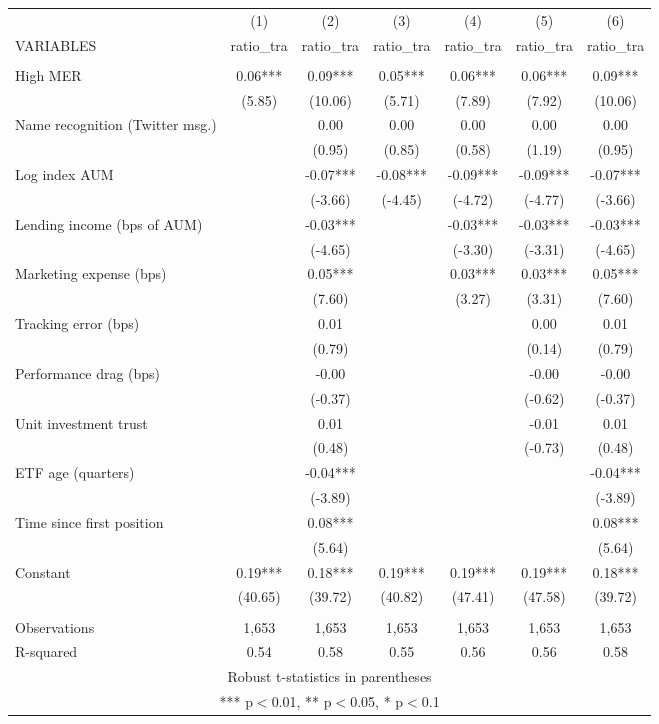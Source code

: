 \documentclass[]{article}
\begin{document}
\begin{tabular}{lcccccc} \hline
 & (1) & (2) & (3) & (4) & (5) & (6) \\
VARIABLES & ratio\_tra & ratio\_tra & ratio\_tra & ratio\_tra & ratio\_tra & ratio\_tra \\ \hline
 &  &  &  &  &  &  \\
High MER & 0.06*** & 0.09*** & 0.05*** & 0.06*** & 0.06*** & 0.09*** \\
 & (5.85) & (10.06) & (5.71) & (7.89) & (7.92) & (10.06) \\
Name recognition (Twitter msg.) &  & 0.00 & 0.00 & 0.00 & 0.00 & 0.00 \\
 &  & (0.95) & (0.85) & (0.58) & (1.19) & (0.95) \\
Log index AUM &  & -0.07*** & -0.08*** & -0.09*** & -0.09*** & -0.07*** \\
 &  & (-3.66) & (-4.45) & (-4.72) & (-4.77) & (-3.66) \\
Lending income (bps of AUM) &  & -0.03*** &  & -0.03*** & -0.03*** & -0.03*** \\
 &  & (-4.65) &  & (-3.30) & (-3.31) & (-4.65) \\
Marketing expense (bps) &  & 0.05*** &  & 0.03*** & 0.03*** & 0.05*** \\
 &  & (7.60) &  & (3.27) & (3.31) & (7.60) \\
Tracking error (bps) &  & 0.01 &  &  & 0.00 & 0.01 \\
 &  & (0.79) &  &  & (0.14) & (0.79) \\
Performance drag (bps) &  & -0.00 &  &  & -0.00 & -0.00 \\
 &  & (-0.37) &  &  & (-0.62) & (-0.37) \\
Unit investment trust &  & 0.01 &  &  & -0.01 & 0.01 \\
 &  & (0.48) &  &  & (-0.73) & (0.48) \\
ETF age (quarters) &  & -0.04*** &  &  &  & -0.04*** \\
 &  & (-3.89) &  &  &  & (-3.89) \\
Time since first position &  & 0.08*** &  &  &  & 0.08*** \\
 &  & (5.64) &  &  &  & (5.64) \\
Constant & 0.19*** & 0.18*** & 0.19*** & 0.19*** & 0.19*** & 0.18*** \\
 & (40.65) & (39.72) & (40.82) & (47.41) & (47.58) & (39.72) \\
 &  &  &  &  &  &  \\
Observations & 1,653 & 1,653 & 1,653 & 1,653 & 1,653 & 1,653 \\
 R-squared & 0.54 & 0.58 & 0.55 & 0.56 & 0.56 & 0.58 \\ \hline
\multicolumn{7}{c}{ Robust t-statistics in parentheses} \\
\multicolumn{7}{c}{ *** p$<$0.01, ** p$<$0.05, * p$<$0.1} \\
\end{tabular}
\end{document}
